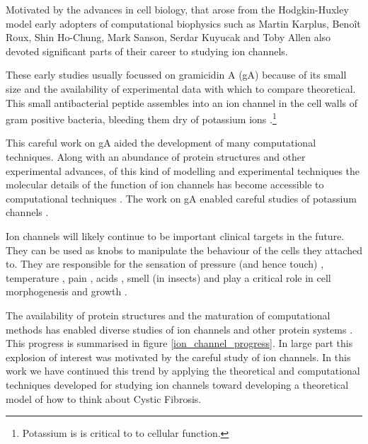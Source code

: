 Motivated by the advances in cell biology, that arose from the Hodgkin-Huxley model early adopters of computational biophysics such as Martin Karplus, Beno\^it Roux, Shin Ho-Chung, Mark Sanson, Serdar Kuyucak and Toby Allen also devoted significant parts of their career to studying ion channels\cite{sansom1991, roux1991, roux1993, sansom1991, allen2003, allen2004, chung2002, tieleman2001}. 

These early studies usually focussed on gramicidin A (gA) because of its small size and the availability of experimental data with which to compare theoretical. This small antibacterial peptide assembles into an ion channel in the cell walls of gram positive bacteria, bleeding them dry of potassium ions \cite{liou2015}.\footnote{Potassium is is critical to to cellular function.}

This careful work on gA aided the development of many computational techniques. Along with an abundance of protein structures and other experimental advances, of this kind of modelling and experimental techniques the molecular details of the function of ion channels has become accessible to computational techniques \cite{flood2019}. The work on gA enabled careful studies of potassium channels \cite{rashid2013, li2021, vandenberg2021}. 

Ion channels will likely continue to be important clinical targets in the future. They can be used as knobs to manipulate the behaviour of the cells they attached to. They are responsible for the sensation of pressure (and hence touch) \cite{chesler2018}, temperature \cite{castillo2018}, pain \cite{kingwell2019}, acids \cite{kweon2013}, smell (in insects) \cite{sato2008} and play a critical role in cell morphogenesis and growth \cite{lang2005, sundelacruz2009, levin2014, levin2014a}.

The availability of protein structures and the maturation of computational methods has enabled diverse studies of ion channels and other protein systems \cite{lev2020, chen2021}. This progress is summarised in figure \ref{ion_channel_progress}. In large part this explosion of interest was motivated by the careful study of ion channels. In this work we have continued this trend by applying the theoretical and computational techniques developed for studying ion channels toward developing a theoretical model of how to think about Cystic Fibrosis. 





